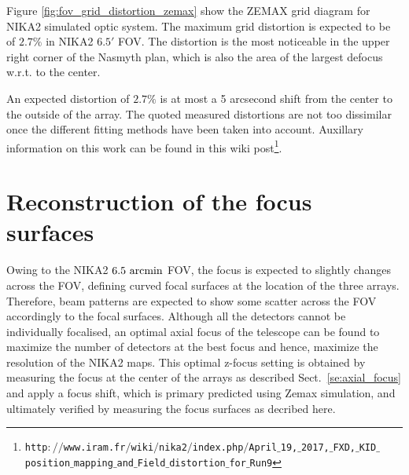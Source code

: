 Figure \ref{fig:fov_grid_distortion_zemax} show the ZEMAX grid diagram for
NIKA2 simulated optic system. The maximum grid distortion is expected
to be of $2.7\%$ in NIKA2 $6.5'$ FOV. The distortion is the most
noticeable in the upper right corner of the Nasmyth plan, which is
also the area of the largest defocus w.r.t. to the center. 

An expected distortion of $2.7\%$ is at most a 5 arcsecond shift from the
center to the outside of the array.  The quoted measured distortions are not
too dissimilar once the different fitting methods have been taken into
account. Auxillary information on this work can be found in this wiki post\footnote{\tiny
  {\tt http$://$www.iram.fr$/$wiki$/$nika2$/$index.php$/$April$\_$19,$\_$2017,$\_$FXD,$\_$KID$\_$position$\_$mapping$\_$and$\_$Field$\_$distortion$\_$for$\_$Run9}}.



\section{Reconstruction of the focus surfaces}%
\label{sec:focus_surfaces}

Owing to the NIKA2 $6.5~\rm{arcmin}$ FOV, the focus is expected to
slightly changes across the FOV, defining curved focal surfaces at the
location of the three arrays. Therefore, beam patterns are expected to
show some scatter across the FOV accordingly to the focal
surfaces. Although all the detectors cannot be individually focalised,
an optimal axial focus of the telescope can be found to maximize the
number of detectors at the best focus and hence, maximize the
resolution of the NIKA2 maps.
This optimal z-focus setting is obtained by measuring the focus at the center of the arrays as described
Sect.~\ref{se:axial_focus} and apply a focus shift, which is primary
predicted using Zemax simulation, and ultimately verified by measuring
the focus surfaces as decribed here.

